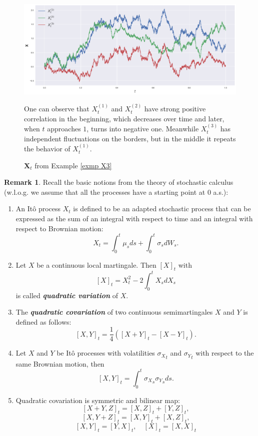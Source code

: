 \documentclass[a4paper,11pt]{article}
\theoremstyle{plain}
\theoremstyle{definition}
\newtheorem{rmrk}[thm]{Remark}
\newcommand{\define}[1]{\textit{\textbf{#1}}}
\begin{document}
	\begin{figure}
		\begin{center} \centering
			\includegraphics[scale=0.4]{X3}
			\caption{$\mathbf{X}_t$ from Example \ref{exmp X3}}
			\smallskip
			\small
			One can observe that $X_t^{(1)}$ and $X_t^{(2)}$ have strong positive correlation in the beginning, which decreases over time and later, when $t$ approaches $1$, turns into negative one. Meanwhile $X_t^{(3)}$ has independent fluctuations on the borders, but in the middle it repeats the behavior of $X_t^{(1)}$.
		\end{center}
	\end{figure}
	
	\begin{rmrk} \label{stoch calc notions}
		Recall the basic notions from the theory of stochastic calculus (w.l.o.g. we assume that all the processes have a starting point at $0$ a.s.):
		\begin{enumerate}
			\item An Itô process $X_t$ is defined to be an adapted stochastic process that can be expressed as the sum of an integral with respect to time and an integral with respect to Brownian motion:
			\[ X_t = \int_{0}^{t} \mu_s ds + \int_{0}^{t} \sigma_s dW_s. \]
			\item Let $X$ be a continuous local martingale. Then $[X]_t$ with
			\[ [X]_t = X_t^2 - 2 \int_0^t X_sdX_s \]
			is called \define{quadratic variation} of $X$.
			\item The \define{quadratic covariation} of two continuous semimartingales $X$ and $Y$ is defined as follows:
			\[ [X, Y]_t = \frac{1}{4}([X + Y]_t - [X-Y]_t). \]
			\item Let $X$ and $Y$ be Itô processes with volatilities ${\sigma_X}_t$ and ${\sigma_Y}_t$ with respect to the same Brownian motion, then
			\[ [X, Y]_t = \int_0^t {\sigma_X}_s{\sigma_Y}_s ds. \]
			\item Quadratic covariation is symmetric and bilinear map:
			\[ [X + Y, Z]_t = [X, Z]_t + [Y, Z]_t, \]
			\[ [X, Y + Z]_t = [X, Y]_t + [X, Z]_t, \]
			\[ [X, Y]_t = [Y, X]_t, \quad [X]_t = [X, X]_t \]
		\end{enumerate}
	\end{rmrk}
	
\end{document}
